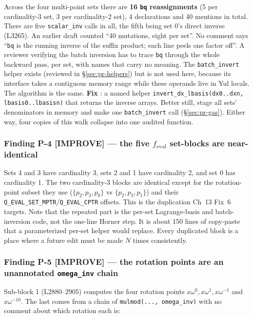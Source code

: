 Across the four multi-point sets there are \textbf{16 \texttt{bq}
reassignments} (5 per cardinality-3 set, 3 per cardinality-2 set),
4 declarations and 40 mentions in total. There are five
\texttt{scalar\_inv} calls in all, the fifth being set 0's direct
inverse (L3265). An earlier draft counted ``40 mutations, eight per
set''. No comment says ``\texttt{bq} is the running inverse of the
suffix product; each line peels one factor off''. A reviewer
verifying the batch inversion has to trace \texttt{bq} through the
whole backward pass, per set, with names that carry no meaning. The
\texttt{batch\_invert} helper exists (reviewed in
\S\ref{sec:pr-helpers}) but is not used here, because its interface
takes a contiguous memory range while these operands live in Yul
locals. The algorithm is the same. \textbf{Fix} : a
named helper \texttt{invert\_\allowbreak{}dx\_\allowbreak{}lbasis(dx0..dxn, lbasis0..lbasisn)}
that returns the inverse arrays. Better still, stage all sets'
denominators in memory and make one \texttt{batch\_invert} call
(\S\ref{sec:pr-gas}). Either way, four copies of this walk collapse
into one audited function.

\subsubsection*{Finding P-4 \textcolor{codegenblue}{[IMPROVE]} --- the five $f_{\text{eval}}$ set-blocks are near-identical}

Sets 4 and 3 have cardinality 3, sets 2 and 1 have cardinality 2,
and set 0 has cardinality 1. The two cardinality-3 blocks are
identical except for the rotation-point subset they use
($\{p_2,p_3,p_0\}$ vs $\{p_2,p_3,p_1\}$) and their
\texttt{Q\_\allowbreak{}EVAL\_\allowbreak{}SET\_\allowbreak{}MPTR}/\texttt{Q\_EVAL\_CPTR} offsets. This is
the duplication Ch~13 Fix~6 targets. Note that the repeated part is
the per-set Lagrange-basis and batch-inversion code, not the
one-line Horner step. It is about 150 lines of copy-paste that a
parameterized per-set helper would replace. Every duplicated block
is a place where a future edit must be made $N$ times consistently.

\subsubsection*{Finding P-5 \textcolor{codegenblue}{[IMPROVE]} --- the rotation points are an unannotated \texttt{omega\_inv} chain}

Sub-block 1 (L2880--2905) computes the four rotation points
$x\omega^{0}, x\omega^{1}, x\omega^{-1}$ and $x\omega^{-10}$. The
last comes from a chain of \texttt{mulmod(..., omega\_\allowbreak{}inv)} with no
comment about which rotation each is:

